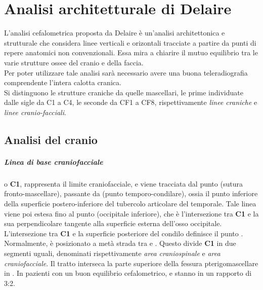 \chapter{Analisi architetturale di Delaire}
\nocite{Delaire1981,Cudia1991}

L'analisi cefalometrica proposta da Delaire è un'analisi architettonica e strutturale che considera linee verticali e orizontali tracciate a partire da punti di repere anatomici non convenzionali. Essa mira a chiarire il mutuo equilibrio tra le varie strutture ossee del cranio e della faccia.\\
Per poter utilizzare tale analisi sarà necessario avere una buona teleradiografia comprendente l'intera calotta cranica.\\

Si distinguono le strutture craniche da quelle mascellari, le prime individuate dalle sigle da C1 a C4, le seconde da CF1 a CF8, rispettivamente \emph{linee craniche} e \emph{linee cranio-facciali}.\\

\section{Analisi del cranio}
\paragraph{Linea di base craniofacciale} o \textbf{C1}, rappresenta il limite craniofacciale, e viene tracciata dal punto  (sutura fronto-mascellare), passante da  (punto temporo-condilare), ossia il punto inferiore della superficie postero-inferiore del tubercolo articolare del temporale. Tale linea viene poi estesa fino al punto  (occipitale inferiore), che è l'intersezione tra \textbf{C1} e la sua perpendicolare tangente alla superficie esterna dell'osso occipitale.\\
L'intersezione tra \textbf{C1} e la superficie posteriore del condilo definisce il punto . Normalmente,  è posizionato a metà strada tra  e . Questo divide \textbf{C1} in due segmenti uguali, denominati rispettivamente \emph{area craniospinale} e \emph{area craniofacciale}. Il tratto  interseca la parte superiore della fessura pterigomascellare in . In pazienti con un buon equilibrio cefalometrico,  e  stanno in un rapporto di 3:2.

